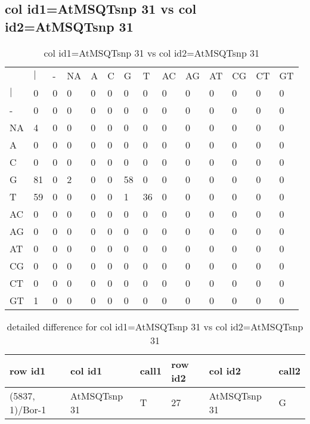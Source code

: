 \subsection{col id1=AtMSQTsnp 31 vs col id2=AtMSQTsnp 31}
\begin{center}
\begin{longtable}{|l|l|l|l|l|l|l|l|l|l|l|l|l|l|}
\caption{col id1=AtMSQTsnp 31 vs col id2=AtMSQTsnp 31} \label{table_dm646}\\
\hline
\\
\hline
&$|$&-&NA&A&C&G&T&AC&AG&AT&CG&CT&GT\\
$|$&0&0&0&0&0&0&0&0&0&0&0&0&0\\
-&0&0&0&0&0&0&0&0&0&0&0&0&0\\
NA&4&0&0&0&0&0&0&0&0&0&0&0&0\\
A&0&0&0&0&0&0&0&0&0&0&0&0&0\\
C&0&0&0&0&0&0&0&0&0&0&0&0&0\\
G&81&0&2&0&0&58&0&0&0&0&0&0&0\\
T&59&0&0&0&0&1&36&0&0&0&0&0&0\\
AC&0&0&0&0&0&0&0&0&0&0&0&0&0\\
AG&0&0&0&0&0&0&0&0&0&0&0&0&0\\
AT&0&0&0&0&0&0&0&0&0&0&0&0&0\\
CG&0&0&0&0&0&0&0&0&0&0&0&0&0\\
CT&0&0&0&0&0&0&0&0&0&0&0&0&0\\
GT&1&0&0&0&0&0&0&0&0&0&0&0&0\\
\hline
\end{longtable}
\end{center}

\begin{center}
\begin{longtable}{|l|l|l|l|l|l|}
\caption{detailed difference for col id1=AtMSQTsnp 31 vs col id2=AtMSQTsnp 31} \label{table_dm647}\\
\hline
row id1&col id1&call1&row id2&col id2&call2\\
\hline
(5837, 1)/Bor-1&AtMSQTsnp 31&T&27&AtMSQTsnp 31&G\\
\hline
\end{longtable}
\end{center}

